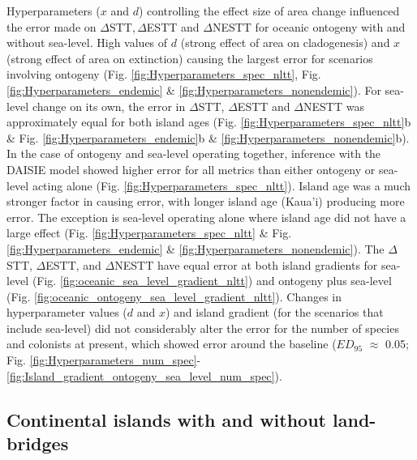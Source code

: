 \documentclass{article}
\begin{document}
Hyperparameters ($x$ and $d$) controlling the effect size of area change influenced the error made on $\Delta$STT$, \Delta$ESTT and $\Delta$NESTT for oceanic ontogeny with and without sea-level. High values of $d$ (strong effect of area on cladogenesis) and $x$ (strong effect of area on extinction) causing the largest error for scenarios involving ontogeny (Fig. \ref{fig:Hyperparameters_spec_nltt}, Fig. \ref{fig:Hyperparameters_endemic} \& \ref{fig:Hyperparameters_nonendemic}). For sea-level change on its own, the error in $\Delta$STT, $\Delta$ESTT and $\Delta$NESTT was approximately equal for both island ages (Fig. \ref{fig:Hyperparameters_spec_nltt}b \& Fig. \ref{fig:Hyperparameters_endemic}b \& \ref{fig:Hyperparameters_nonendemic}b). In the case of ontogeny and sea-level operating together, inference with the DAISIE model showed higher error for all metrics than either ontogeny or sea-level acting alone (Fig. \ref{fig:Hyperparameters_spec_nltt}). Island age was a much stronger factor in causing error, with longer island age (Kaua'i) producing more error. The exception is sea-level operating alone where island age did not have a large effect (Fig. \ref{fig:Hyperparameters_spec_nltt} \& Fig. \ref{fig:Hyperparameters_endemic} \& \ref{fig:Hyperparameters_nonendemic}). The $\Delta$STT, $\Delta$ESTT, and $\Delta$NESTT have equal error at both island gradients for sea-level (Fig. \ref{fig:oceanic_sea_level_gradient_nltt}) and ontogeny plus sea-level (Fig. \ref{fig:oceanic_ontogeny_sea_level_gradient_nltt}). Changes in hyperparameter values ($d$ and $x$) and island gradient (for the scenarios that include sea-level) did not considerably alter the error for the number of species and colonists at present, which showed error around the baseline ($ED_{95}$ $\approx$ 0.05; Fig. \ref{fig:Hyperparameters_num_spec}-\ref{fig:Island_gradient_ontogeny_sea_level_num_spec}).\\

\subsection*{Continental islands with and without land-bridges}
\end{document}
